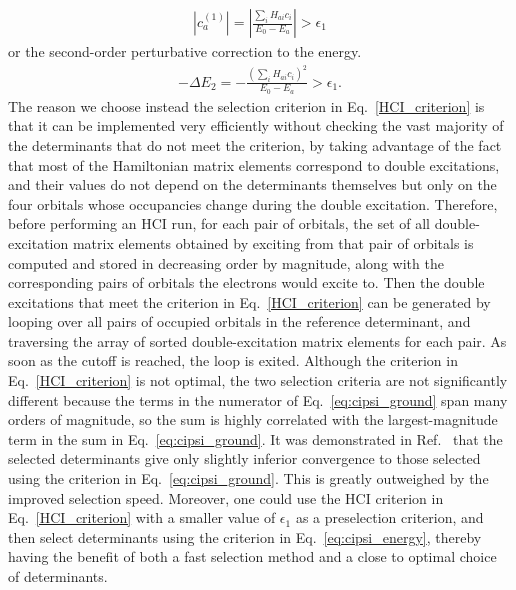\documentclass[%
reprint,
 superscriptaddress,
 amsmath,amssymb,
 aps,
]{revtex4-1}
\def\beq{\begin{eqnarray}}
\def\eeq{\end{eqnarray}}
\begin{document}
\beq
\left|c_a^{(1)}\right|=\left|\frac{\sum_i H_{ai}c_i}{E_0-E_a}\right| > \epsilon_1
\label{eq:cipsi_ground}
\eeq
or the second-order perturbative correction to the energy.
\beq
-\Delta E_2=-\frac{\left(\sum_i H_{ai}c_i\right)^2}{E_0-E_a} > \epsilon_1.
\label{eq:cipsi_energy}
\eeq
The reason we choose instead the selection criterion in Eq.~\ref{HCI_criterion} is that it can be implemented
very efficiently without checking the vast majority of the determinants that do not meet the criterion, by taking advantage
of the fact that %
most of the Hamiltonian matrix elements correspond to double excitations, and their values do not depend
on the determinants themselves but only on the four orbitals whose occupancies change during the double excitation.
Therefore, before performing an HCI run, for each pair of orbitals, the set of all double-excitation matrix elements
obtained by exciting from that pair of orbitals is computed and stored
in decreasing order by magnitude, along with the corresponding pairs of orbitals the electrons would excite to.
Then the double excitations that meet the criterion in Eq.~\ref{HCI_criterion} can be generated by
looping over all pairs of occupied orbitals in the reference determinant, and
traversing the array of sorted double-excitation matrix elements for each pair.
As soon as the cutoff is reached, the loop is exited.
Although the criterion in Eq.~\ref{HCI_criterion} is not optimal, the two selection criteria are not significantly different because
the terms in the numerator of Eq.~\ref{eq:cipsi_ground}
span many orders of magnitude, so the sum is highly correlated with the largest-magnitude term in the sum in Eq.~\ref{eq:cipsi_ground}.
It was demonstrated in Ref.~\cite{HolTubUmr-JCTC-16} that the selected determinants give only slightly inferior convergence
to those selected using the criterion in Eq.~\ref{eq:cipsi_ground}.  This is greatly outweighed by the improved selection speed.
Moreover, one could use the HCI criterion in Eq.~\ref{HCI_criterion} with a smaller value of $\epsilon_1$ as a preselection criterion, and then select determinants
using the criterion in Eq.~\ref{eq:cipsi_energy}, thereby having the benefit of both a fast selection method and a
close to optimal choice of determinants.
\end{document}
